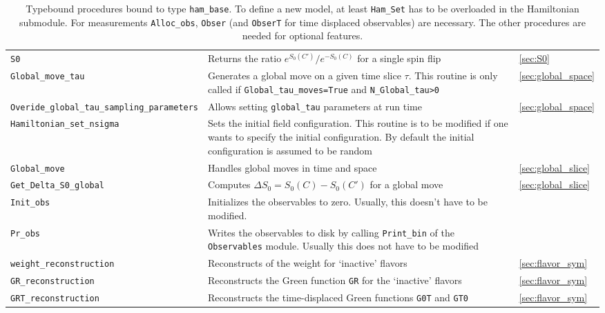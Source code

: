 \begin{table}[h!]
\begin{center}
\begin{tabular}{ p{} p{} p{} }
   \texttt{S0}     &
      Returns the ratio $e^{S_0(C')} /e^{-S_0(C)} $ for a single spin flip  &
         \ref{sec:S0} \\    
   \texttt{Global\_move\_tau} &
      Generates a global move on a given time slice $\tau$.  This routine is only called
      if \texttt{Global\_tau\_moves=True} and \texttt{N\_Global\_tau>0} & 
         \ref{sec:global_space} \\
   \texttt{Overide\_global\_tau\_sampling\_parameters}     &
      Allows setting \texttt{global\_tau} parameters at run time  &
         \ref{sec:global_space} \\  
   \texttt{Hamiltonian\_set\_nsigma} &
      Sets the initial field configuration. This routine is to be modified if one wants
      to specify the initial configuration. By default the initial configuration is
      assumed to be random  &  \\
   \texttt{Global\_move} &  
      Handles global moves in time and space &
         \ref{sec:global_slice}  \\
   \texttt{Get\_Delta\_S0\_global} &
      Computes $\Delta S_0=S_0(C)-S_0(C')$ for a global move  &
         \ref{sec:global_slice} \\ 
   \texttt{Init\_obs}  &
      Initializes the observables to zero. Usually, this doesn't have to be modified. & \\    
   \texttt{Pr\_obs}   &
      Writes the observables to disk by calling
      \texttt{Print\_bin} of the \texttt{Observables} module.
      Usually this does not have to be modified &   \\    
      \texttt{weight\_reconstruction}   &
      Reconstructs of the weight for `inactive' flavors &  \ref{sec:flavor_sym}  \\    
      \texttt{GR\_reconstruction}   &
      Reconstructs the Green function \texttt{GR} for the `inactive' flavors &  \ref{sec:flavor_sym}  \\    
      \texttt{GRT\_reconstruction}   &
      Reconstructs the time-displaced Green functions \texttt{G0T} and \texttt{GT0} & \ref{sec:flavor_sym}
 \\\bottomrule   
 \end{tabular}
\caption{Typebound procedures bound to type \texttt{ham\_base}. To define a new model, at least \texttt{Ham\_Set} has to be overloaded in the Hamiltonian submodule. For measurements \texttt{Alloc\_obs}, \texttt{Obser} (and \texttt{ObserT} for time displaced observables) are necessary.
The other procedures are needed for optional features.
\label{table:hamiltonian_procedures} }
\end{center}
\end{table}
%



